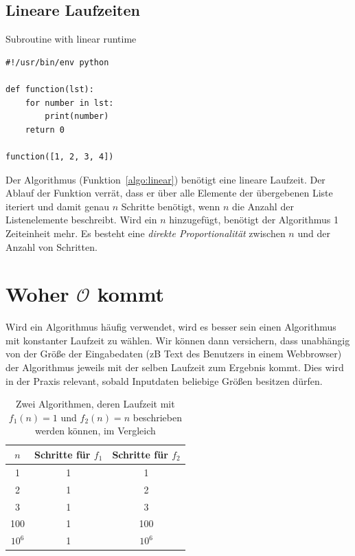 \subsection{Lineare Laufzeiten}
%
\begin{algorithm}[p]
\caption{Subroutine with linear runtime}
\label{algo:linear}
\begin{lstlisting}
#!/usr/bin/env python

def function(lst):
    for number in lst:
        print(number)
    return 0

function([1, 2, 3, 4])
\end{lstlisting}
\end{algorithm}

Der Algorithmus (Funktion~\ref{algo:linear}) benötigt eine lineare Laufzeit. Der Ablauf der Funktion verrät, dass er über alle Elemente der übergebenen Liste iteriert und damit genau $n$ Schritte benötigt, wenn $n$ die Anzahl der Listenelemente beschreibt. Wird ein $n$ hinzugefügt, benötigt der Algorithmus 1 Zeiteinheit mehr. Es besteht eine \emph{direkte Proportionalität} zwischen $n$ und der Anzahl von Schritten.

\section{Woher $\mathcal{O}$ kommt}
%
Wird ein Algorithmus häufig verwendet, wird es besser sein einen Algorithmus mit konstanter Laufzeit zu wählen. Wir können dann versichern, dass unabhängig von der Größe der Eingabedaten (zB Text des Benutzers in einem Webbrowser) der Algorithmus jeweils mit der selben Laufzeit zum Ergebnis kommt. Dies wird in der Praxis relevant, sobald Inputdaten beliebige Größen besitzen dürfen.
%
\begin{table}
 \begin{center}
  \begin{tabular}{ccc}
   $n$ & Schritte für $f_1$ & Schritte für $f_2$ \\
  \hline
   1  & 1                  & 1 \\
   2  & 1                  & 2 \\
   3  & 1                  & 3 \\
   100 & 1                 & 100 \\
   $10^6$ & 1              & $10^6$ \\
 \hline
  \end{tabular}
  \caption{Zwei Algorithmen, deren Laufzeit mit $f_1(n) = 1$ und $f_2(n) = n$ beschrieben werden können, im Vergleich}
 \end{center}
\end{table}

